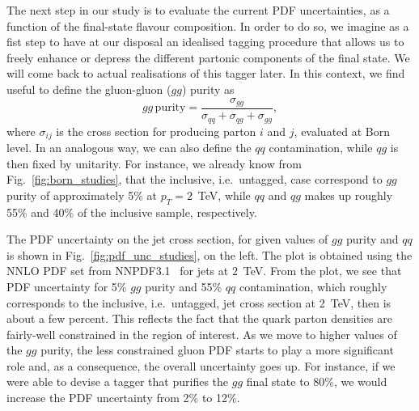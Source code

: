 The next step in our study is to evaluate the current PDF uncertainties, as a function of the final-state flavour composition. 
%
In order to do so, we imagine as a fist step to have at our disposal an idealised tagging procedure that allows us to freely enhance or depress the different partonic components of the final state. We will come back to actual realisations of this tagger later. 
%
In this context, we find useful to define the gluon-gluon ($gg$) purity as
\begin{equation}\label{gg-purity}
gg \, \text{purity}= \frac{\sigma_{gg}}{\sigma_{qq}+\sigma_{qg}+\sigma_{gg}},
\end{equation}
where $\sigma_{ij}$ is the cross section for producing parton $i$ and $j$, evaluated at Born level.  In an analogous way, we can also define the $q q$ contamination, while $q g$ is then fixed by unitarity. 
%
For instance, we already know from Fig.~\ref{fig:born_studies}, that the inclusive, i.e.\ untagged, case correspond to $gg$ purity of approximately 5\% at $p_T=2$~TeV, while $qq$ and $qg$ makes up roughly 55\% and 40\% of the inclusive sample, respectively. 

%
The PDF uncertainty on the jet cross section, for given values of $gg$ purity and $qq$ is shown in Fig.~\ref{fig:pdf_unc_studies}, on the left. The plot is obtained using the NNLO PDF set from NNPDF3.1~\cite{Ball:2017nwa} for jets at $2$~TeV.
%
%
From the plot, we see that PDF uncertainty for 5\% $gg$ purity and 55\% $qq$ contamination, which roughly corresponds to the inclusive, i.e.\ untagged, jet cross section at 2~TeV, then is about a few percent.
%
This reflects the fact that the quark parton densities are fairly-well constrained in the region of interest. 
%
As we move to higher values of the $gg$ purity, the less constrained gluon PDF starts to play a more significant role and, as a consequence, the overall uncertainty goes up. For instance, if we were able to devise a tagger that purifies the $gg$ final state to 80\%, we would increase the PDF uncertainty from 2\% to 12\%. 

